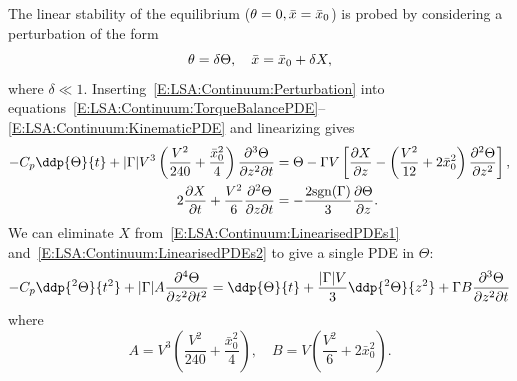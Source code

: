 The linear stability of the equilibrium ($\theta = 0, \bar{x} = \bar{x}_0$) is probed by considering a perturbation of the form
\begin{equation}\label{E:LSA:Continuum:Perturbation}
\theta = \delta \Theta,\quad \bar{x} = \bar{x}_0 + \delta X,
\end{equation}
where $\delta \ll 1$. Inserting~\eqref{E:LSA:Continuum:Perturbation}  into equations~\eqref{E:LSA:Continuum:TorqueBalancePDE}--\eqref{E:LSA:Continuum:KinematicPDE} and linearizing gives
\begin{align}
- C_p\ddp{\Theta}{t}+ |\Gamma|V^3\left(\frac{V^2}{240} + \frac{\bar{x}_0^2}{4}\right) \frac{\partial^3 \Theta}{\partial z^2 \partial t} &= \Theta - \Gamma V \left[\frac{\partial X}{\partial z} - \left(\frac{V^2}{12} + 2  \bar{x}_0^2 \right)\frac{\partial^2 \Theta}{\partial z^2}\right],\label{E:LSA:Continuum:LinearisedPDEs1}\\
2\frac{\partial X}{\partial t} +\frac{V^2}{6} \frac{\partial^2 \Theta}{\partial z \partial t} &= -\frac{2\sgn(\Gamma)}{3} \frac{\partial \Theta}{\partial z}.\label{E:LSA:Continuum:LinearisedPDEs2}
\end{align}
We can eliminate $X$ from~\eqref{E:LSA:Continuum:LinearisedPDEs1} and~\eqref{E:LSA:Continuum:LinearisedPDEs2} to give a single PDE in $\Theta$:
\begin{equation}\label{E:LSA:Continuum:SinglePDE}
- C_p\ddp{^2\Theta}{t^2}+ |\Gamma|A\frac{\partial^4 \Theta}{\partial z^2 \partial t^2} = \ddp{\Theta}{t} +  \frac{|\Gamma| V}{3}\ddp{^2 \Theta}{z^2} +\Gamma B\frac{\partial^3 \Theta}{\partial z^2\partial t}
\end{equation}
where
\begin{equation}
A = V^3\left(\frac{V^2}{240} + \frac{\bar{x}_0^2}{4}\right), \quad B = V\left(\frac{V^2}{6} + 2  \bar{x}_0^2 \right).
\end{equation}

